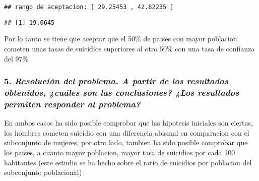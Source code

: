 \documentclass[]{article}
\newenvironment{Shaded}{\begin{snugshade}}{\end{snugshade}}
\newcommand{\KeywordTok}[1]{\textcolor[rgb]{0.13,0.29,0.53}{\textbf{#1}}}
\newcommand{\OperatorTok}[1]{\textcolor[rgb]{0.81,0.36,0.00}{\textbf{#1}}}
\newcommand{\NormalTok}[1]{#1}
\begin{document}
\begin{verbatim}
## rango de aceptacion: [ 29.25453 , 42.82235 ]
\end{verbatim}

\begin{Shaded}
\end{Shaded}

\begin{verbatim}
## [1] 19.0645
\end{verbatim}

Por lo tanto se tiene que aceptar que el 50\% de paises con mayor
poblacion cometen unas tasas de suicidios superiores al otro 50\% con
una tasa de confianza del 97\%

\subsubsection{\texorpdfstring{5. \emph{Resolución del problema. A
partir de los resultados obtenidos, ¿cuáles son las conclusiones? ¿Los
resultados permiten responder al
problema?}}{5. Resolución del problema. A partir de los resultados obtenidos, ¿cuáles son las conclusiones? ¿Los resultados permiten responder al problema?}}\label{resolucion-del-problema.-a-partir-de-los-resultados-obtenidos-cuales-son-las-conclusiones-los-resultados-permiten-responder-al-problema}

En ambos casos ha sido posible comprobar que las hipotesis iniciales son
ciertas, los hombres cometen suicidio con una diferencia abismal en
comparacion con el subconjunto de mujeres, por otro lado, tambien ha
sido posible comprobar que los paises, a cuanto mayor poblacion, mayor
tasa de suicidios por cada 100 habitantes (este estudio se ha hecho
sobre el ratio de suicidios por poblacion del subconjunto poblacional)
\end{document}
